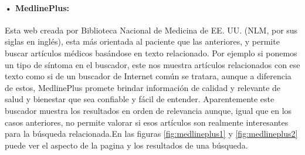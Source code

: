 \paragraph{• MedlinePlus\cite{ref:medlineplus_home}:} Esta web creada por Biblioteca Nacional de Medicina de EE. UU. (NLM, por sus siglas en inglés), esta más orientada al paciente que las anteriores, y permite buscar artículos médicos basándose en texto relacionado. Por ejemplo si ponemos un tipo de síntoma en el buscador, este nos muestra artículos relacionados con ese texto como si de un buscador de Internet común se tratara, aunque a diferencia de estos, MedlinePlus promete brindar información de calidad y relevante de salud y bienestar que sea confiable y fácil de entender. Aparentemente este buscador muestra los resultados en orden de relevancia aunque, igual que en los casos anteriores, no permite valorar si esos artículos son realmente interesantes para la búsqueda relacionada.En las figuras \ref{fig:medlineplus1} y \ref{fig:medlineplus2} puede ver el aspecto de la pagina y los resultados de una búsqueda.

